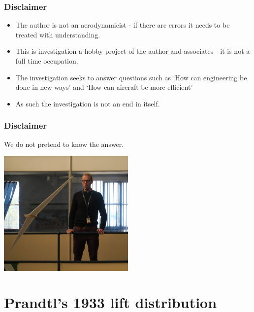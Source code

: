 \documentclass{beamer}
\begin{document}
\begin{frame}
\frametitle{Disclaimer}

\begin{itemize}
\item The author is not an aerodynamicist - if there are errors it needs to be treated with understanding.
\item This is investigation a hobby project of the author and associates - it is not a full time occupation.  
\item The investigation seeks to answer questions such as `How can engineering be done in new ways' and `How can aircraft be more efficient'
\item As such the investigation is not an end in itself.
\end{itemize}

\end{frame}


\begin{frame}
\frametitle{Disclaimer}

We do not pretend to know the answer.

\includegraphics[width = 0.5\textwidth]{Pictures/NoIdea.JPG}

\end{frame}


\section{Prandtl's 1933 lift distribution}
\end{document}
